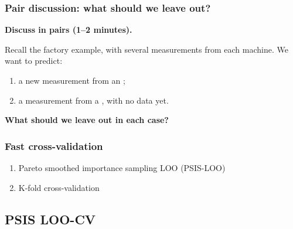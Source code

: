 \documentclass[10pt]{beamer}
\begin{document}
\begin{frame}
\frametitle{Pair discussion: what should we leave out?}

  {\color{uured}\textbf{Discuss in pairs (1--2 minutes).}}

  Recall the factory example, with several measurements from each machine.
  We want to predict:
  \begin{enumerate}
    \item a new measurement from an ;
    \item a measurement from a , with no data yet.
  \end{enumerate}

  \textbf{What should we leave out in each case?}

\end{frame}


\begin{frame}{}

\frametitle{Fast cross-validation}

\begin{enumerate}
\item Pareto smoothed importance sampling LOO (PSIS-LOO)
\pause
\item K-fold cross-validation
\end{enumerate}

\vspace{12\baselineskip}


\end{frame}

\subsection{PSIS LOO-CV}
\frame{\subsectionpage}
\end{document}
